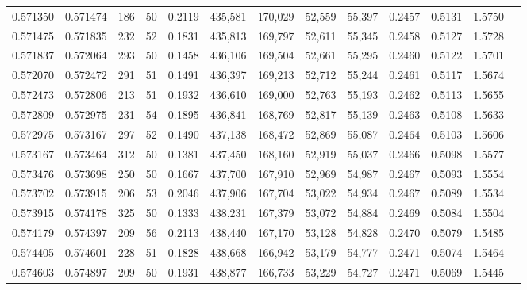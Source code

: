 \begin{tabular}{rrrrrrrrrrrrr}
0.571350 & 0.571474 &   186 &  50 &                                     0.2119 & 435,581 & 170,029 &  52,559 &  55,397 & 0.2457 & 0.5131 & 1.5750 \\
0.571475 & 0.571835 &   232 &  52 &                                     0.1831 & 435,813 & 169,797 &  52,611 &  55,345 & 0.2458 & 0.5127 & 1.5728 \\
0.571837 & 0.572064 &   293 &  50 &                                     0.1458 & 436,106 & 169,504 &  52,661 &  55,295 & 0.2460 & 0.5122 & 1.5701 \\
0.572070 & 0.572472 &   291 &  51 &                                     0.1491 & 436,397 & 169,213 &  52,712 &  55,244 & 0.2461 & 0.5117 & 1.5674 \\
0.572473 & 0.572806 &   213 &  51 &                                     0.1932 & 436,610 & 169,000 &  52,763 &  55,193 & 0.2462 & 0.5113 & 1.5655 \\
0.572809 & 0.572975 &   231 &  54 &                                     0.1895 & 436,841 & 168,769 &  52,817 &  55,139 & 0.2463 & 0.5108 & 1.5633 \\
0.572975 & 0.573167 &   297 &  52 &                                     0.1490 & 437,138 & 168,472 &  52,869 &  55,087 & 0.2464 & 0.5103 & 1.5606 \\
0.573167 & 0.573464 &   312 &  50 &                                     0.1381 & 437,450 & 168,160 &  52,919 &  55,037 & 0.2466 & 0.5098 & 1.5577 \\
0.573476 & 0.573698 &   250 &  50 &                                     0.1667 & 437,700 & 167,910 &  52,969 &  54,987 & 0.2467 & 0.5093 & 1.5554 \\
0.573702 & 0.573915 &   206 &  53 &                                     0.2046 & 437,906 & 167,704 &  53,022 &  54,934 & 0.2467 & 0.5089 & 1.5534 \\
0.573915 & 0.574178 &   325 &  50 &                                     0.1333 & 438,231 & 167,379 &  53,072 &  54,884 & 0.2469 & 0.5084 & 1.5504 \\
0.574179 & 0.574397 &   209 &  56 &                                     0.2113 & 438,440 & 167,170 &  53,128 &  54,828 & 0.2470 & 0.5079 & 1.5485 \\
0.574405 & 0.574601 &   228 &  51 &                                     0.1828 & 438,668 & 166,942 &  53,179 &  54,777 & 0.2471 & 0.5074 & 1.5464 \\
0.574603 & 0.574897 &   209 &  50 &                                     0.1931 & 438,877 & 166,733 &  53,229 &  54,727 & 0.2471 & 0.5069 & 1.5445 \\

\end{tabular}
